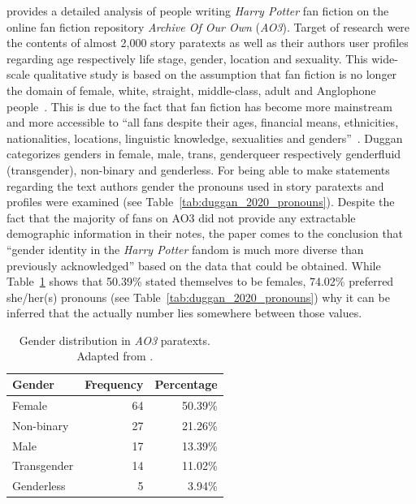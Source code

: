 \citet{Duggan2020WhoAO3} provides a detailed analysis of people writing \emph{Harry Potter} fan fiction on the online fan fiction repository \emph{Archive Of Our Own} (\emph{AO3}).
Target of research were the contents of almost 2,000 story paratexts as well as their authors user profiles regarding age respectively life stage, gender, location and sexuality.
This wide-scale qualitative study is based on the assumption that fan fiction is no longer the domain of female, white, straight, middle-class, adult and Anglophone people~\citep{Busse2017ACultures, HelleksonBusse2006, Scott2013TextualScott, Lothian2007YearningSpace, Stanfill2011DoingFandom}.
This is due to the fact that fan fiction has become more mainstream~\cite[74]{Barnes2015FanfictionFiction} and more accessible to ``all fans despite their ages, financial means, ethnicities, nationalities, locations, linguistic knowledge, sexualities and genders''~\citep{Duggan2022Worlds...ofFiction}.
Duggan categorizes genders in female, male, trans, genderqueer respectively genderfluid (transgender), non-binary and genderless.
For being able to make statements regarding the text authors gender the pronouns used in story paratexts and profiles were examined (see Table~\ref{tab:duggan_2020_pronouns}).
Despite the fact that the majority of fans on AO3 did not provide any extractable demographic information in their notes, the paper comes to the conclusion that ``gender identity in the \emph{Harry Potter} fandom is much more diverse than previously acknowledged'' based on the data that could be obtained.
While Table~\ref{tab:duggan_2020_gender} shows that 50.39\% stated themselves to be females, 74.02\% preferred she/her(s) pronouns (see Table~\ref{tab:duggan_2020_pronouns}) why it can be inferred that the actually number lies somewhere between those values.
\begin{table}[ht]
    \centering
    \begin{tabular}{lrr}
        \toprule
        \textbf{Gender} & \textbf{Frequency} & \textbf{Percentage} \\
        \midrule
        Female          & 64                 & 50.39\%             \\
        Non-binary      & 27                 & 21.26\%             \\
        Male            & 17                 & 13.39\%             \\
        Transgender     & 14                 & 11.02\%             \\
        Genderless      & 5                  & 3.94\%              \\
        \bottomrule
    \end{tabular}
    \caption[Gender distribution in \emph{AO3} paratexts.]{Gender distribution in \emph{AO3} paratexts.
    Adapted from \citet[Table~1]{Duggan2020WhoAO3}.}
    \label{tab:duggan_2020_gender}
\end{table}
